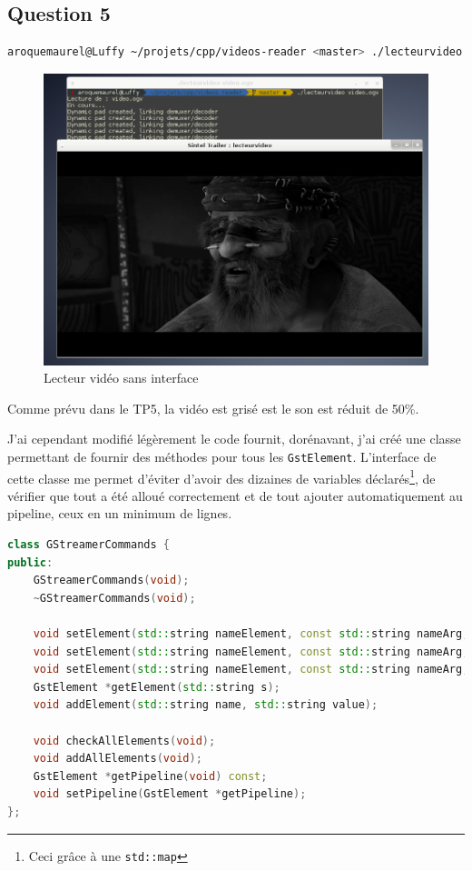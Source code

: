 \documentclass[a4paper, 11pt]{article}
\begin{document}
	\subsection{Question 5}
	\begin{lstlisting}[language=sh]
 aroquemaurel@Luffy ~/projets/cpp/videos-reader <master> ./lecteurvideo video.ogv 
	\end{lstlisting}
	\begin{figure}[H]
		\centering
		\includegraphics[width=17cm]{img/1.png}
		\caption{Lecteur vidéo sans interface}
	\end{figure}
	Comme prévu dans le TP5, la vidéo est grisé est le son est réduit de 50\%. 

	J'ai cependant modifié légèrement le code fournit, dorénavant, j'ai créé une classe permettant de fournir des méthodes pour tous les \texttt{GstElement}.
	L'interface de cette classe me permet d'éviter d'avoir des dizaines de variables déclarés\footnote{Ceci grâce à une \texttt{std::map}}, de vérifier que tout a été alloué correctement et de tout ajouter
	automatiquement au pipeline, ceux en un minimum de lignes.
	
	\begin{lstlisting}[language=C++, caption=Interface de gestion des commandes GStreamer]
class GStreamerCommands {
public:
	GStreamerCommands(void);
	~GStreamerCommands(void);

	void setElement(std::string nameElement, const std::string nameArg, const std::string valuePropertie);
	void setElement(std::string nameElement, const std::string nameArg, const double valuePropertie);
	void setElement(std::string nameElement, const std::string nameArg, const bool valuePropertie);
	GstElement *getElement(std::string s);
	void addElement(std::string name, std::string value);

	void checkAllElements(void);
	void addAllElements(void);
	GstElement *getPipeline(void) const;
	void setPipeline(GstElement *getPipeline);
};
	\end{lstlisting}
\end{document}
